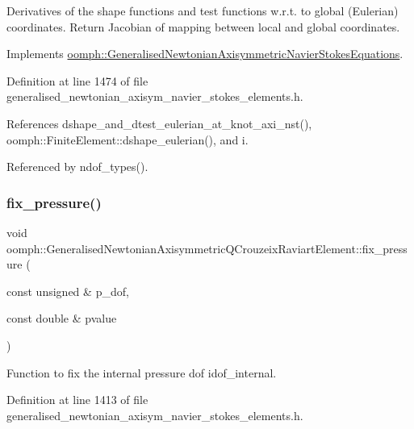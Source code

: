Derivatives of the shape functions and test functions w.\+r.\+t. to global (Eulerian) coordinates. Return Jacobian of mapping between local and global coordinates. 

Implements \hyperlink{classoomph_1_1GeneralisedNewtonianAxisymmetricNavierStokesEquations_a9321e8563cb2dfec9824024008a6914e}{oomph\+::\+Generalised\+Newtonian\+Axisymmetric\+Navier\+Stokes\+Equations}.



Definition at line 1474 of file generalised\+\_\+newtonian\+\_\+axisym\+\_\+navier\+\_\+stokes\+\_\+elements.\+h.



References dshape\+\_\+and\+\_\+dtest\+\_\+eulerian\+\_\+at\+\_\+knot\+\_\+axi\+\_\+nst(), oomph\+::\+Finite\+Element\+::dshape\+\_\+eulerian(), and i.



Referenced by ndof\+\_\+types().

\mbox{\label{classoomph_1_1GeneralisedNewtonianAxisymmetricQCrouzeixRaviartElement_ac9f7cbb723c9abf2c6f34aef1cf999b0}} 
\subsubsection{\texorpdfstring{fix\+\_\+pressure()}{fix\_pressure()}}
{\footnotesize\ttfamily void oomph\+::\+Generalised\+Newtonian\+Axisymmetric\+Q\+Crouzeix\+Raviart\+Element\+::fix\+\_\+pressure (\begin{DoxyParamCaption}\item[{const unsigned \&}]{p\+\_\+dof,  }\item[{const double \&}]{pvalue }\end{DoxyParamCaption})\hspace{0.3cm}{\ttfamily [inline]}}



Function to fix the internal pressure dof idof\+\_\+internal. 



Definition at line 1413 of file generalised\+\_\+newtonian\+\_\+axisym\+\_\+navier\+\_\+stokes\+\_\+elements.\+h.



